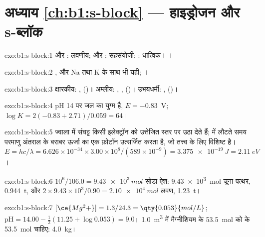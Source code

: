\section*{अध्याय \ref{ch:b1:s-block} --- हाइड्रोजन और s-ब्लॉक}

\begin{solution}{exo:b1:s-block:1}
 और : लवणीय;  और : सहसंयोजी;
: धात्विक। ।
\end{solution}

\begin{solution}{exo:b1:s-block:2}
, और Na तथा K के साथ भी यही;
।
\end{solution}

\begin{solution}{exo:b1:s-block:3}
क्षारकीय: ,  ()। अम्लीय:
, ,  ()। उभयधर्मी:
,  ()।
\end{solution}

\begin{solution}{exo:b1:s-block:4}
pH 14 पर जल का युग्म  है, $E = -0.83$~V;
$\log K = 2(-0.83 + 2.71)/0.059 = 64$।
\end{solution}

\begin{solution}{exo:b1:s-block:5}
ज्वाला में संघट्ट किसी इलेक्ट्रॉन को उत्तेजित स्तर पर उठा देते हैं;  में
लौटते समय परमाणु अंतराल के बराबर ऊर्जा का एक फ़ोटॉन उत्सर्जित करता है, जो
तत्त्व के लिए विशिष्ट है। $E = hc/\lambda = 6.626 \times 10^{-34} \times
3.00 \times 10^8/(589 \times 10^{-9}) = \qty{3.375e-19}{J} = \qty{2.11}{eV}$।
\end{solution}

\begin{solution}{exo:b1:s-block:6}
$10^6/106.0 = \qty{9.43e3}{mol}$ सोडा ऐश: \qty{9.43e3}{mol}
चूना पत्थर, \qty{0.944}{t}, और $2 \times 9.43 \times 10^3/0.90 =
\qty{2.10e4}{mol}$ लवण, \qty{1.23}{t}।
\end{solution}

\begin{solution}{exo:b1:s-block:7}
$[\ce{Mg^2+}] = 1.3/24.3 = \qty{0.053}{mol/L}$; $\mathrm{pH} = 14.00 -
\frac12(11.25 + \log 0.053) = 9.0$। \qty{1.0}{m^3} में मैग्नीशियम के \qty{53.5}{mol}
को  के \qty{53.5}{mol} चाहिए: \qty{4.0}{kg}।
\end{solution}

